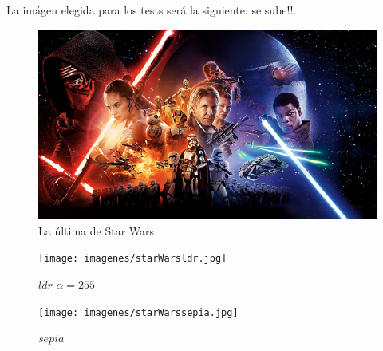 La imágen elegida para los tests será la siguiente: se sube!!.

\begin{figure}
  \begin{center}
	\includegraphics[scale=0.10]{imagenes/starWars.jpg}
	\caption{La última de Star Wars}
	\label{starwars}
  \end{center}
\end{figure}

\begin{figure}
  \begin{center}
	\texttt{[image: imagenes/starWarsldr.jpg]}
	\caption{$ldr$ $\alpha = 255$}
	\label{starwarsldr}
  \end{center}
\end{figure}

\begin{figure}
  \begin{center}
	\texttt{[image: imagenes/starWarssepia.jpg]}
	\caption{$sepia$}
	\label{starwarssepia}
  \end{center}
\end{figure}


